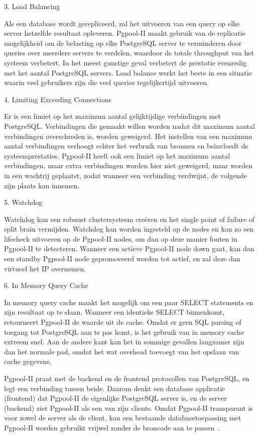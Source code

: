 3. Load Balancing

Als een database wordt gerepliceerd, zal het uitvoeren van een query op elke server hetzelfde resultaat opleveren. Pgpool-II maakt gebruik van de replicatie mogelijkheid om de belasting op elke PostgreSQL server te verminderen door queries over meerdere servers te verdelen, waardoor de totale throughput van het systeem verbetert. In het meest gunstige geval verbetert de prestatie evenredig met het aantal PostgreSQL servers. Load balance werkt het beste in een situatie waarin veel gebruikers zijn die veel queries tegelijkertijd uitvoeren.

4. Limiting Exceeding Connections

Er is een limiet op het maximum aantal gelijktijdige verbindingen met PostgreSQL. Verbindingen die gemaakt willen worden nadat dit maximum aantal verbindingen overschreden is, worden geweigerd. Het instellen van een maximum aantal verbindingen verhoogt echter het verbruik van bronnen en beïnvloedt de systeemprestaties. Pgpool-II heeft ook een limiet op het maximum aantal verbindingen, maar extra verbindingen worden hier niet geweigerd, maar worden in een wachtrij geplaatst, zodat wanneer een verbinding verdwijnt, de volgende zijn plaats kan innemen.

5. Watchdog

Watchdog kan een robuust clustersysteem creëren en het single point of failure of split brain vermijden. Watchdog kan worden ingesteld op de nodes en kan zo een lifecheck uitvoeren op de Pgpool-II nodes, om dan op deze manier fouten in Pgpool-II te detecteren. Wanneer een actieve Pgpool-II node down gaat, kan dan een standby Pgpool-II node gepromoveerd worden tot actief, en zal deze dan virtueel het IP overnemen. 

6. In Memory Query Cache

In memory query cache maakt het mogelijk om een paar SELECT statements en zijn resultaat op te slaan. Wanneer een identieke SELECT binnenkomt, retourneert Pgpool-II de waarde uit de cache. Omdat er geen SQL parsing of toegang tot PostgreSQL aan te pas komt, is het gebruik van in memory cache extreem snel. Aan de andere kant kan het in sommige gevallen langzamer zijn dan het normale pad, omdat het wat overhead toevoegt van het opslaan van cache gegevens.

Pgpool-II praat met de backend en de frontend protocollen van PostgreSQL, en legt een verbinding tussen beide. Daarom denkt een database applicatie (frontend) dat Pgpool-II de eigenlijke PostgreSQL server is, en de server (backend) ziet Pgpool-II als een van zijn clients. Omdat Pgpool-II transparant is voor zowel de server als de client, kan een bestaande databasetoepassing met Pgpool-II worden gebruikt vrijwel zonder de broncode aan te passen~\autocite{2021}. %



